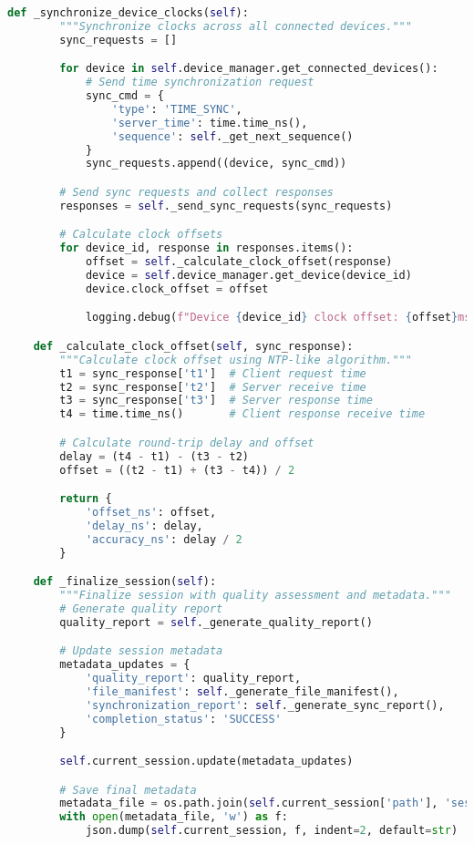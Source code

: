 \begin{lstlisting}[language=Python, caption=Session Management Implementation]
    def _synchronize_device_clocks(self):
        """Synchronize clocks across all connected devices."""
        sync_requests = []

        for device in self.device_manager.get_connected_devices():
            # Send time synchronization request
            sync_cmd = {
                'type': 'TIME_SYNC',
                'server_time': time.time_ns(),
                'sequence': self._get_next_sequence()
            }
            sync_requests.append((device, sync_cmd))

        # Send sync requests and collect responses
        responses = self._send_sync_requests(sync_requests)

        # Calculate clock offsets
        for device_id, response in responses.items():
            offset = self._calculate_clock_offset(response)
            device = self.device_manager.get_device(device_id)
            device.clock_offset = offset

            logging.debug(f"Device {device_id} clock offset: {offset}ms")

    def _calculate_clock_offset(self, sync_response):
        """Calculate clock offset using NTP-like algorithm."""
        t1 = sync_response['t1']  # Client request time
        t2 = sync_response['t2']  # Server receive time
        t3 = sync_response['t3']  # Server response time
        t4 = time.time_ns()       # Client response receive time

        # Calculate round-trip delay and offset
        delay = (t4 - t1) - (t3 - t2)
        offset = ((t2 - t1) + (t3 - t4)) / 2

        return {
            'offset_ns': offset,
            'delay_ns': delay,
            'accuracy_ns': delay / 2
        }

    def _finalize_session(self):
        """Finalize session with quality assessment and metadata."""
        # Generate quality report
        quality_report = self._generate_quality_report()

        # Update session metadata
        metadata_updates = {
            'quality_report': quality_report,
            'file_manifest': self._generate_file_manifest(),
            'synchronization_report': self._generate_sync_report(),
            'completion_status': 'SUCCESS'
        }

        self.current_session.update(metadata_updates)

        # Save final metadata
        metadata_file = os.path.join(self.current_session['path'], 'session_metadata.json')
        with open(metadata_file, 'w') as f:
            json.dump(self.current_session, f, indent=2, default=str)


\end{lstlisting}
